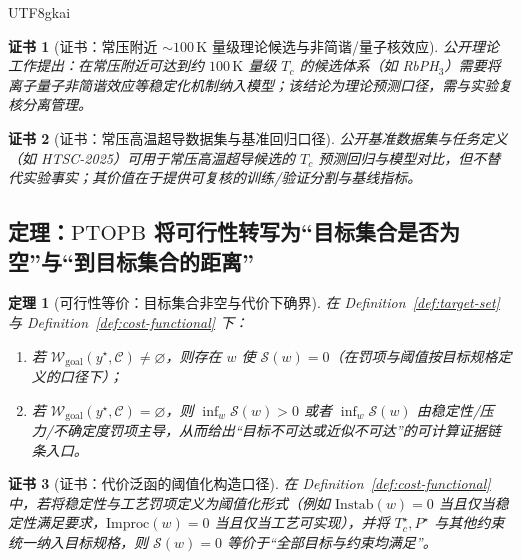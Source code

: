 \documentclass[12pt]{article}
\newtheorem{theorem}{定理}[section]
\newtheorem{certificate}{证书}[section]
\newcommand{\PTOPB}{\ensuremath{\mathrm{PTOPB}}}
\begin{document}
\begin{CJK*}{UTF8}{gkai}
\begin{certificate}[证书：常压附近 $\sim 100\,\mathrm{K}$ 量级理论候选与非简谐/量子核效应]
\label{cert:rbph3-ambient-100k}
公开理论工作提出：在常压附近可达到约 $100\,\mathrm{K}$ 量级 $T_c$ 的候选体系（如 RbPH$_3$）需要将离子量子非简谐效应等稳定化机制纳入模型；该结论为理论预测口径，需与实验复核分离管理。
  \cite{ScienceDirectRbPH3}
\end{certificate}

\begin{certificate}[证书：常压高温超导数据集与基准回归口径]
\label{cert:htsc-2025-dataset}
公开基准数据集与任务定义（如 HTSC-2025）可用于常压高温超导候选的 $T_c$ 预测回归与模型对比，但不替代实验事实；其价值在于提供可复核的训练/验证分割与基线指标。\cite{arXivHTSC2025}
\end{certificate}

\subsection{定理：\PTOPB{} 将可行性转写为“目标集合是否为空”与“到目标集合的距离”}

\begin{theorem}[可行性等价：目标集合非空与代价下确界]
\label{thm:feasibility-as-emptiness}
在 Definition~\ref{def:target-set} 与 Definition~\ref{def:cost-functional} 下：
\begin{enumerate}
  \item 若 $\mathcal{W}_{\mathrm{goal}}(y^\star,\mathcal{C})\neq\varnothing$，则存在 $w$ 使 $\mathcal{S}(w)
    =0$（在罚项与阈值按目标规格定义的口径下）；
  \item 若 $\mathcal{W}_{\mathrm{goal}}(y^\star,\mathcal{C})=\varnothing$，则 $\inf_{w}\mathcal{S}(w)>0$ 或者
    $\inf_w\mathcal{S}(w)$ 由稳定性/压力/不确定度罚项主导，从而给出“目标不可达或近似不可达”的可计算证据链条入口。
\end{enumerate}
\end{theorem}

\begin{certificate}[证书：代价泛函的阈值化构造口径]
\label{cert:thresholded-cost}
在 Definition~\ref{def:cost-functional} 中，若将稳定性与工艺罚项定义为阈值化形式（例如 $\mathrm{Instab}(w)=0$ 当且仅当稳定性满足要求，$\mathrm{Improc}(w)=0$
  当且仅当工艺可实现），并将 $T_c^\star,P^\star$ 与其他约束统一纳入目标规格，则 $\mathcal{S}(w)=0$ 等价于“全部目标与约束均满足”。
\end{certificate}


\end{CJK*}
\end{document}
